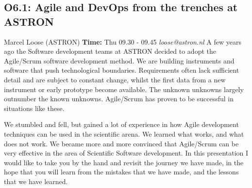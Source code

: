 \documentclass{report}
\begin{document}
\subsection*{O6.1: Agile and DevOps from the trenches at ASTRON}
\bigskip
Marcel Loose (ASTRON) \newline   \newline   \newline   \newline  \newline  \newline\newline
{\bf Time:} Thu 09.30 - 09.45\newline
\newline
{\it loose@astron.nl}\newline
\newline\newline
A few years ago the Software development teams at ASTRON decided to adopt the Agile/Scrum software development method. We are building instruments and software that push technological boundaries. Requirements often lack sufficient detail and are subject to constant change, whilst the first data from a new instrument or early prototype become available. The unknown unknowns largely outnumber the known unknowns. Agile/Scrum has proven to be successful in situations like these. 

We stumbled and fell, but gained a lot of experience in how Agile development techniques can be used in the scientific arena. We learned what works, and what does not work. We became more and more convinced that Agile/Scrum can be very effective in the area of Scientific Software development. In this presentation I would like to take you by the hand and revisit the journey we have made, in the hope that you will learn from the mistakes that we have made, and the lessons that we have learned.\newline
\newpage
\end{document}
